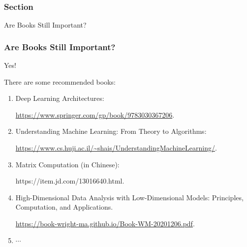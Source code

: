 \documentclass[aspectratio=2516]{beamer}
\begin{document}
\begin{frame}
	\frametitle{ Section \uppercase\expandafter{}}
	
	\begin{center}
		\Large Are Books Still Important?
	\end{center}
	
\end{frame}

\begin{frame}
	\frametitle{Are Books Still Important?}
	
	\begin{center}
		{\color{blue} \Large Yes!}
	\end{center}

{\small  There are some recommended books:}

\vspace{0.25cm}

\begin{enumerate}
	\item {\small Deep Learning Architectures}:
	
	{\tiny \color{blue}\url{https://www.springer.com/gp/book/9783030367206}}.
	
	\vspace{0.25cm}
	
	\item {\small Understanding Machine Learning: From Theory to Algorithms}:
	
	{\tiny \color{blue} \url{https://www.cs.huji.ac.il/~shais/UnderstandingMachineLearning/}}.
	
	\vspace{0.25cm}
	
	\item {\small Matrix Computation (in Chinese)}:
	
	{\tiny \color{blue} https://item.jd.com/13016640.html}.
	
	\vspace{0.25cm}
	
	\item {\small High-Dimensional Data Analysis with Low-Dimensional Models: Principles, Computation, and Applications}.
	
	{\tiny \color{blue} \url{https://book-wright-ma.github.io/Book-WM-20201206.pdf}}.
	
	\item $ \cdots  $
\end{enumerate}

\end{frame}
\end{document}
